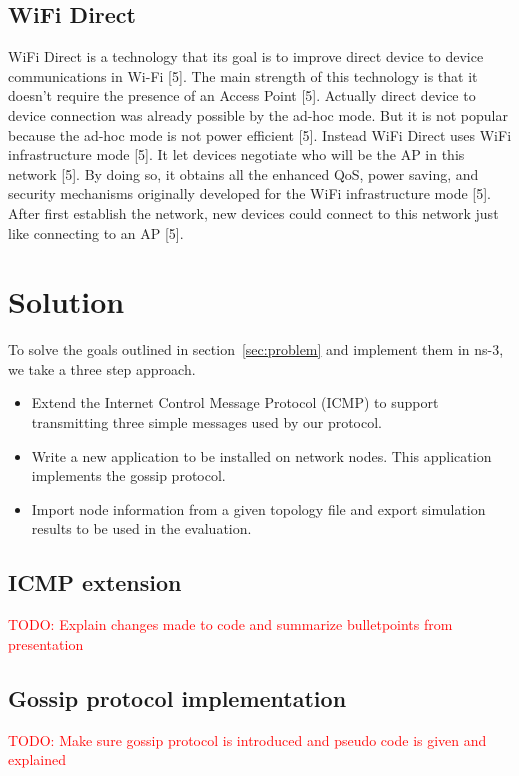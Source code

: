 \documentclass[journal]{IEEEtran}
\begin{document}
\subsection{WiFi Direct}
WiFi Direct is a technology that its goal is to improve direct device to device communications in Wi-Fi [5]. The main strength of this technology is that it doesn’t require the presence of an Access Point [5]. Actually direct device to device connection was already possible by the ad-hoc mode. But it is not popular because the ad-hoc mode is not power efficient [5]. Instead WiFi Direct uses WiFi infrastructure mode [5]. It let devices negotiate who will be the AP in this network [5]. By doing so, it obtains all the enhanced QoS, power saving, and security mechanisms originally developed for the WiFi infrastructure mode [5]. After first establish the network, new devices could connect to this network just like connecting to an AP [5].

\section{Solution}
To solve the goals outlined in section~\ref{sec:problem} and implement them in ns-3, we take a three step approach.

\begin{itemize}
 \item Extend the Internet Control Message Protocol (ICMP) to support transmitting three simple messages used by our protocol.
 \item Write a new application to be installed on network nodes. This application implements the gossip protocol.
 \item Import node information from a given topology file and export simulation results to be used in the evaluation.
\end{itemize}

\subsection{ICMP extension}
\textcolor{red}{TODO: Explain changes made to code and summarize bulletpoints from presentation}

\subsection{Gossip protocol implementation}
\textcolor{red}{TODO: Make sure gossip protocol is introduced and pseudo code is given and explained}
\end{document}
